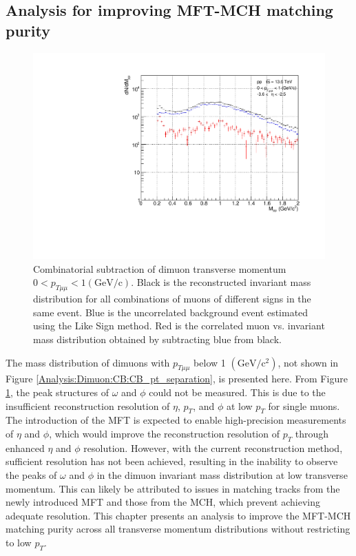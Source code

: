     \subsection{Analysis for improving MFT-MCH matching purity}
    \label{matching improvements}
        \begin{figure}
            \centering
            \includegraphics[keepaspectratio, scale=0.4]{fig/3_6_CB_pt0to1.pdf}
            \caption{Combinatorial subtraction of dimuon transverse momentum $0 < p_{T\mu\mu} < 1 (\mathrm{GeV/c})$. Black is the reconstructed invariant mass distribution for all combinations of muons of different signs in the same event. Blue is the uncorrelated background event estimated using the Like Sign method. Red is the correlated muon vs. invariant mass distribution obtained by subtracting blue from black.}
            \label{Analysis:Dimuon:pt0to1}
        \end{figure}
        The mass distribution of dimuons with \( p_{T\mu\mu} \) below 1 $(\mathrm{GeV/c^2})$, not shown in Figure \ref{Analysis:Dimuon:CB:CB_pt_separation}, is presented here.
        From Figure \ref{Analysis:Dimuon:pt0to1}, the peak structures of \(\omega\) and \(\phi\) could not be measured. This is due to the insufficient reconstruction resolution of \(\eta\), \(p_T\), and \(\phi\) at low \(p_T\) for single muons. The introduction of the MFT is expected to enable high-precision measurements of \(\eta\) and \(\phi\), which would improve the reconstruction resolution of \(p_T\) through enhanced \(\eta\) and \(\phi\) resolution. However, with the current reconstruction method, sufficient resolution has not been achieved, resulting in the inability to observe the peaks of \(\omega\) and \(\phi\) in the dimuon invariant mass distribution at low transverse momentum. This can likely be attributed to issues in matching tracks from the newly introduced MFT and those from the MCH, which prevent achieving adequate resolution. This chapter presents an analysis to improve the MFT-MCH matching purity across all transverse momentum distributions without restricting to low \(p_T\).

